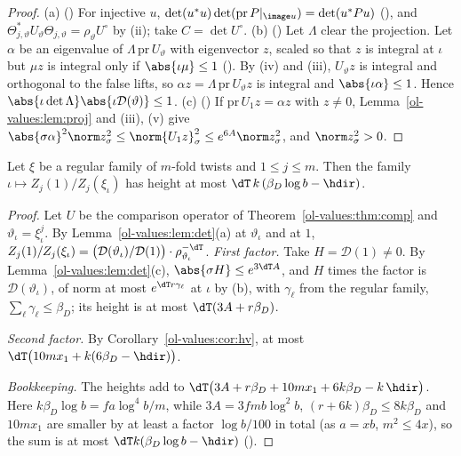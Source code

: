 \begin{proof}
(a) () For injective $u$, $\det(u^*u)\det(\mathrm{pr}\,P|_{\image u})=\det(u^*Pu)$
(), and
$\Theta^*_{j,\vartheta}U_\vartheta\Theta_{j,\vartheta}=\rho_\vartheta U^\circ$ by (ii); take
$C=\det U^\circ$. (b) () Let $\Lambda$ clear the projection. Let $\alpha$ be an eigenvalue of
$\Lambda\,\mathrm{pr}\,U_\vartheta$ with eigenvector $z$, scaled so that $z$ is integral at $\iota$
but $\mu z$ is integral only if $\abs{\iota\mu}\le1$
(). By (iv) and (iii), $U_\vartheta z$
is integral and orthogonal to the false lifts, so $\alpha z=\Lambda\,\mathrm{pr}\,U_\vartheta z$ is
integral and $\abs{\iota\alpha}\le1$. Hence $\abs{\iota\det\Lambda}\abs{\iota\mathcal D(\vartheta)}\le1$.
(c) () If $\mathrm{pr}\,U_1z=\alpha z$ with $z\ne0$, Lemma~\ref{ol-values:lem:proj} and (iii), (v) give
$\abs{\sigma\alpha}^2\norm z^2_\sigma\le\norm{U_1z}^2_\sigma\le e^{6A}\norm z^2_\sigma$, and
$\norm z^2_\sigma>0$.
\end{proof}

\begin{theorem}
\label{ol-values:thm:main}
Let $\xi$ be a regular family of $m$-fold twists and $1\le j\le m$. Then the family
$\iota\mapsto Z_j(1)/Z_j(\xi_\iota)$ has height at most $\dT\,k\,(\beta_D\log b-\hdir)$.
\end{theorem}

\begin{proof}
Let $U$ be the comparison operator of Theorem~\ref{ol-values:thm:comp} and $\vartheta_\iota=
\xi_\iota^j$. By Lemma~\ref{ol-values:lem:det}(a) at $\vartheta_\iota$ and at $1$,
$Z_j(1)/Z_j(\xi_\iota)=\bigl(\mathcal D(\vartheta_\iota)/\mathcal D(1)\bigr)\cdot
\rho_{\vartheta_\iota}^{-\dT}$. \emph{First factor.} Take $H=\mathcal D(1)\ne0$. By Lemma~\ref{ol-values:lem:det}(c),
$\abs{\sigma H}\le e^{3\dT A}$, and $H$ times the factor is $\mathcal D(\vartheta_\iota)$, of norm at
most $e^{\dT r\gamma_\ell}$ at $\iota$ by (b), with $\gamma_\ell$ from the regular family,
$\sum_\ell\gamma_\ell\le\beta_D$; its height is at most $\dT(3A+r\beta_D)$.

\emph{Second factor.} By Corollary~\ref{ol-values:cor:hv}, at most
$\dT\bigl(10mx_1+k(6\beta_D-\hdir)\bigr)$.

\emph{Bookkeeping.} The heights add to
$\dT\bigl(3A+r\beta_D+10mx_1+6k\beta_D-k\,\hdir\bigr)$. Here $k\beta_D\log b=fa\log^4b/m$, while
$3A=3fmb\log^2b$, $(r+6k)\beta_D\le8k\beta_D$ and $10mx_1$ are smaller by at least a factor
$\log b/100$ in total (as $a=xb$, $m^2\le4x$), so the sum is at most
$\dT k(\beta_D\log b-\hdir)$ ().
\end{proof}

